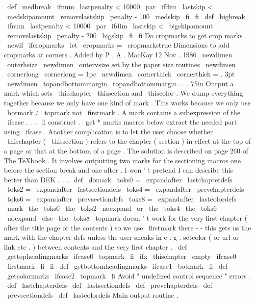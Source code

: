 \
def
\
medbreak
{
\
ifnum
\
lastpenalty
<
10000
\
par
\
ifdim
\
lastskip
<
\
medskipamount
\
removelastskip
\
penalty
-
100
\
medskip
\
fi
\
fi
}
\
def
\
bigbreak
{
\
ifnum
\
lastpenalty
<
10000
\
par
\
ifdim
\
lastskip
<
\
bigskipamount
\
removelastskip
\
penalty
-
200
\
bigskip
\
fi
\
fi
}
%
Do
cropmarks
to
get
crop
marks
.
%
\
newif
\
ifcropmarks
\
let
\
cropmarks
=
\
cropmarkstrue
%
%
Dimensions
to
add
cropmarks
at
corners
.
%
Added
by
P
.
A
.
MacKay
12
Nov
.
1986
%
\
newdimen
\
outerhsize
\
newdimen
\
outervsize
%
set
by
the
paper
size
routines
\
newdimen
\
cornerlong
\
cornerlong
=
1pc
\
newdimen
\
cornerthick
\
cornerthick
=
.
3pt
\
newdimen
\
topandbottommargin
\
topandbottommargin
=
.
75in
%
Output
a
mark
which
sets
\
thischapter
\
thissection
and
\
thiscolor
.
%
We
dump
everything
together
because
we
only
have
one
kind
of
mark
.
%
This
works
because
we
only
use
\
botmark
/
\
topmark
not
\
firstmark
.
%
%
A
mark
contains
a
subexpression
of
the
\
ifcase
.
.
.
\
fi
construct
.
%
\
get
*
marks
macros
below
extract
the
needed
part
using
\
ifcase
.
%
%
Another
complication
is
to
let
the
user
choose
whether
\
thischapter
%
(
\
thissection
)
refers
to
the
chapter
(
section
)
in
effect
at
the
top
%
of
a
page
or
that
at
the
bottom
of
a
page
.
The
solution
is
%
described
on
page
260
of
The
TeXbook
.
It
involves
outputting
two
%
marks
for
the
sectioning
macros
one
before
the
section
break
and
%
one
after
.
I
won
'
t
pretend
I
can
describe
this
better
than
DEK
.
.
.
\
def
\
domark
{
%
\
toks0
=
\
expandafter
{
\
lastchapterdefs
}
%
\
toks2
=
\
expandafter
{
\
lastsectiondefs
}
%
\
toks4
=
\
expandafter
{
\
prevchapterdefs
}
%
\
toks6
=
\
expandafter
{
\
prevsectiondefs
}
%
\
toks8
=
\
expandafter
{
\
lastcolordefs
}
%
\
mark
{
%
\
the
\
toks0
\
the
\
toks2
\
noexpand
\
or
\
the
\
toks4
\
the
\
toks6
\
noexpand
\
else
\
the
\
toks8
}
%
}
%
\
topmark
doesn
'
t
work
for
the
very
first
chapter
(
after
the
title
%
page
or
the
contents
)
so
we
use
\
firstmark
there
-
-
this
gets
us
%
the
mark
with
the
chapter
defs
unless
the
user
sneaks
in
e
.
g
.
%
setcolor
(
or
url
or
link
etc
.
)
between
contents
and
the
very
%
first
chapter
.
\
def
\
gettopheadingmarks
{
%
\
ifcase0
\
topmark
\
fi
\
ifx
\
thischapter
\
empty
\
ifcase0
\
firstmark
\
fi
\
fi
}
\
def
\
getbottomheadingmarks
{
\
ifcase1
\
botmark
\
fi
}
\
def
\
getcolormarks
{
\
ifcase2
\
topmark
\
fi
}
%
Avoid
"
undefined
control
sequence
"
errors
.
\
def
\
lastchapterdefs
{
}
\
def
\
lastsectiondefs
{
}
\
def
\
prevchapterdefs
{
}
\
def
\
prevsectiondefs
{
}
\
def
\
lastcolordefs
{
}
%
Main
output
routine
.
\
